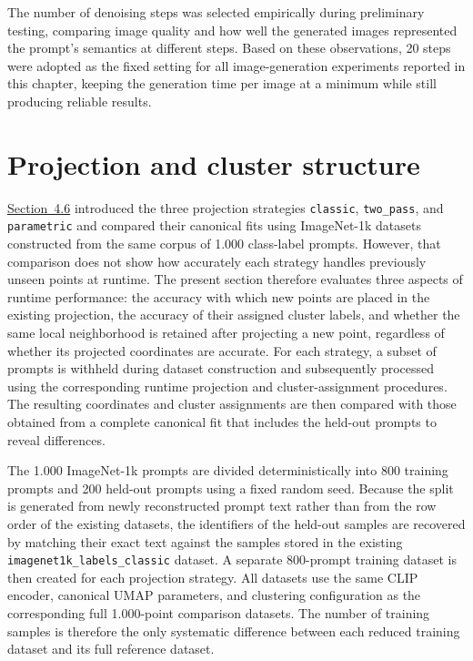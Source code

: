 The number of denoising steps was selected empirically during preliminary testing, comparing image quality and how well the generated images represented the prompt's semantics at different steps. Based on these observations, 20 steps were adopted as the fixed setting for all image-generation experiments reported in this chapter, keeping the generation time per image at a minimum while still producing reliable results.

\FloatBarrier
\section{Projection and cluster structure}\label{sec:5.2}

\hyperref[sec:4.6]{Section~4.6} introduced the three projection strategies \texttt{classic}, \texttt{two\_pass}, and \texttt{parametric} and compared their canonical fits using ImageNet-1k datasets constructed from the same corpus of 1.000 class-label prompts. However, that comparison does not show how accurately each strategy handles previously unseen points at runtime. The present section therefore evaluates three aspects of runtime performance: the accuracy with which new points are placed in the existing projection, the accuracy of their assigned cluster labels, and whether the same local neighborhood is retained after projecting a new point, regardless of whether its projected coordinates are accurate. For each strategy, a subset of prompts is withheld during dataset construction and subsequently processed using the corresponding runtime projection and cluster-assignment procedures. The resulting coordinates and cluster assignments are then compared with those obtained from a complete canonical fit that includes the held-out prompts to reveal differences.

The 1.000 ImageNet-1k prompts are divided deterministically into 800 training prompts and 200 held-out prompts using a fixed random seed. Because the split is generated from newly reconstructed prompt text rather than from the row order of the existing datasets, the identifiers of the held-out samples are recovered by matching their exact text against the samples stored in the existing \texttt{imagenet1k\_labels\_classic} dataset. A separate 800-prompt training dataset is then created for each projection strategy. All datasets use the same CLIP encoder, canonical UMAP parameters, and clustering configuration as the corresponding full 1.000-point comparison datasets. The number of training samples is therefore the only systematic difference between each reduced training dataset and its full reference dataset.

